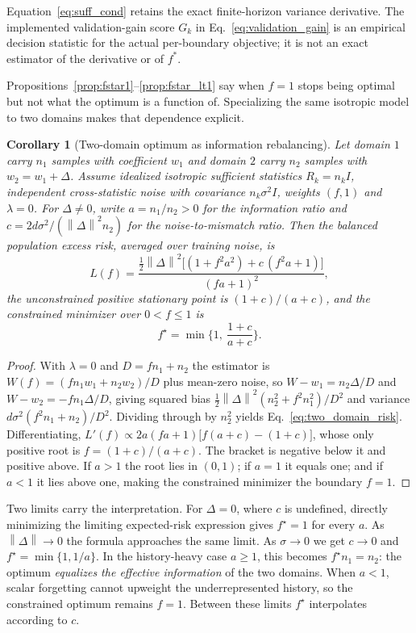 \documentclass[10pt]{article}
\newtheorem{corollary}{Corollary}
\newcommand{\norm}[1]{\left\|#1\right\|}
\begin{document}
Equation~\eqref{eq:suff_cond} retains the exact finite-horizon variance
derivative.  The implemented validation-gain score $G_k$ in
Eq.~\eqref{eq:validation_gain} is an empirical decision statistic for the
actual per-boundary objective; it is not an exact estimator of the derivative
or of $f^*$.

Propositions~\ref{prop:fstar1}--\ref{prop:fstar_lt1} say when $f=1$ stops being
optimal but not what the optimum is a function of.  Specializing the same
isotropic model to two domains makes that dependence explicit.

\begin{corollary}[Two-domain optimum as information rebalancing]
\label{cor:information_balance}
Let domain $1$ carry $n_1$ samples with coefficient $w_1$ and domain $2$ carry
$n_2$ samples with $w_2=w_1+\Delta$. Assume idealized isotropic sufficient
statistics $R_k=n_kI$, independent cross-statistic noise with covariance
$n_k\sigma^2I$, weights $(f,1)$ and $\lambda=0$. For $\Delta\ne0$, write
$a=n_1/n_2>0$ for the information ratio and
$c=2d\sigma^2/(\norm{\Delta}^2n_2)$ for the noise-to-mismatch ratio. Then the
balanced population excess risk, averaged over training noise, is
\begin{equation}
  L(f)=\frac{\tfrac12\norm{\Delta}^2\big[(1+f^2a^2)+c\,(f^2a+1)\big]}
             {(fa+1)^2},
  \label{eq:two_domain_risk}
\end{equation}
the unconstrained positive stationary point is $(1+c)/(a+c)$, and the
constrained minimizer over $0<f\le1$ is
\begin{equation}
  f^\star=\min\Big\{1,\ \frac{1+c}{a+c}\Big\}.
  \label{eq:two_domain_fstar}
\end{equation}
\end{corollary}
\begin{proof}
With $\lambda=0$ and $D=fn_1+n_2$ the estimator is
$W(f)=(fn_1w_1+n_2w_2)/D$ plus mean-zero noise, so
$W-w_1=n_2\Delta/D$ and $W-w_2=-fn_1\Delta/D$, giving squared bias
$\tfrac12\norm{\Delta}^2(n_2^2+f^2n_1^2)/D^2$ and variance
$d\sigma^2(f^2n_1+n_2)/D^2$.  Dividing through by $n_2^2$ yields
Eq.~\eqref{eq:two_domain_risk}.  Differentiating,
$L'(f)\propto 2a(fa+1)\big[f(a+c)-(1+c)\big]$, whose only positive root is
$f=(1+c)/(a+c)$. The bracket is negative below it and positive above. If
$a>1$ the root lies in $(0,1)$; if $a=1$ it equals one; and if $a<1$ it lies
above one, making the constrained minimizer the boundary $f=1$.
\end{proof}

Two limits carry the interpretation. For $\Delta=0$, where $c$ is undefined,
directly minimizing the limiting expected-risk expression gives $f^\star=1$
for every $a$. As $\norm{\Delta}\to0$ the formula approaches the same limit.
As $\sigma\to0$ we get $c\to0$ and
$f^\star=\min\{1,1/a\}$. In the history-heavy case $a\ge1$, this becomes
$f^\star n_1=n_2$: the optimum \emph{equalizes the effective information} of
the two domains. When $a<1$, scalar forgetting cannot upweight the
underrepresented history, so the constrained optimum remains $f=1$. Between
these limits $f^\star$ interpolates according to $c$.
\end{document}
